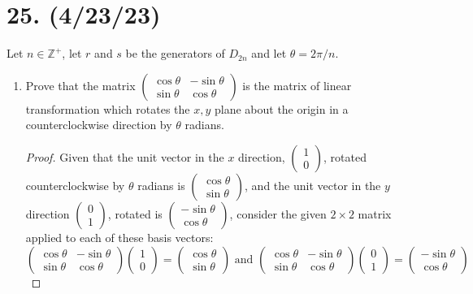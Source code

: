 \documentclass{article}
\begin{document}
\section*{25. (4/23/23)}

Let $n \in \mathbb{Z}^+$, let $r$ and $s$ be the generators of $D_{2n}$ and let $\theta = 2\pi / n$.

\begin{enumerate}[label=(\alph*)]
    \item Prove that the matrix $\begin{pmatrix}\cos \theta & -\sin \theta\\\sin \theta & \cos \theta\end{pmatrix}$ is the matrix of linear transformation which rotates the $x, y$ plane about the origin in a counterclockwise direction by $\theta$ radians.
          \begin{proof}
            Given that the unit vector in the $x$ direction, $\begin{pmatrix}1 \\ 0\end{pmatrix}$, rotated counterclockwise by $\theta$ radians is $\begin{pmatrix}\cos \theta \\ \sin \theta\end{pmatrix}$, and the unit vector in the $y$ direction $\begin{pmatrix}0 \\ 1\end{pmatrix}$, rotated is $\begin{pmatrix}-\sin \theta \\ \cos \theta\end{pmatrix}$, consider the given $2 \times 2$ matrix applied to each of these basis vectors:
            \begin{equation*}
                \begin{pmatrix}\cos \theta & -\sin \theta\\\sin \theta & \cos \theta\end{pmatrix}\begin{pmatrix}1 \\ 0\end{pmatrix} = \begin{pmatrix}\cos \theta \\ \sin \theta\end{pmatrix} \text{ and } \begin{pmatrix}\cos \theta & -\sin \theta\\\sin \theta & \cos \theta\end{pmatrix}\begin{pmatrix}0 \\ 1\end{pmatrix} = \begin{pmatrix}-\sin \theta \\ \cos \theta\end{pmatrix}

\end{equation*}
\end{proof}
\end{enumerate}
\end{document}
